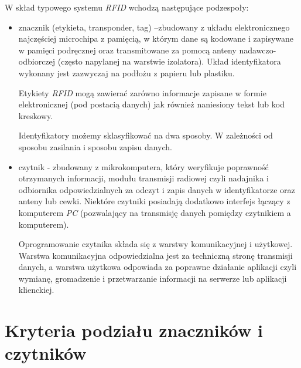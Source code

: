 \noindent  
\newline W skład typowego systemu \emph{RFID} wchodzą następujące podzespoły:
\begin{itemize}\setlength{\itemsep}{0pt}

	\item znacznik  (etykieta, transponder, tag) –zbudowany z układu elektronicznego najczęściej microchipa z pamięcią, w którym dane są  kodowane i zapisywane w pamięci podręcznej oraz transmitowane za pomocą anteny nadawczo-odbiorczej (często napylanej na warstwie izolatora). Układ identyfikatora wykonany jest zazwyczaj na podłożu z papieru lub plastiku. 

	Etykiety \emph{RFID} mogą zawierać zarówno informacje zapisane w formie elektronicznej (pod postacią danych) jak również naniesiony tekst lub kod kreskowy. 

	Identyfikatory możemy sklasyfikować na dwa sposoby. W zależności od sposobu zasilania i sposobu zapisu danych. 

	\item czytnik - zbudowany z mikrokomputera, który weryfikuje poprawność otrzymanych informacji, modułu transmisji radiowej czyli nadajnika i odbiornika  odpowiedzialnych za odczyt i zapis danych w identyfikatorze oraz anteny lub cewki. Niektóre czytniki posiadają dodatkowo interfejs łączący z komputerem \emph{PC} (pozwalający na transmisję danych pomiędzy czytnikiem a komputerem).
	
	Oprogramowanie czytnika składa się z warstwy komunikacyjnej i użytkowej. Warstwa komunikacyjna odpowiedzialna jest za techniczną stronę transmisji danych, a warstwa użytkowa odpowiada za poprawne działanie aplikacji czyli wymianę, gromadzenie i przetwarzanie informacji na serwerze lub aplikacji klienckiej.


\end{itemize}



\section{Kryteria podziału znaczników i czytników}

